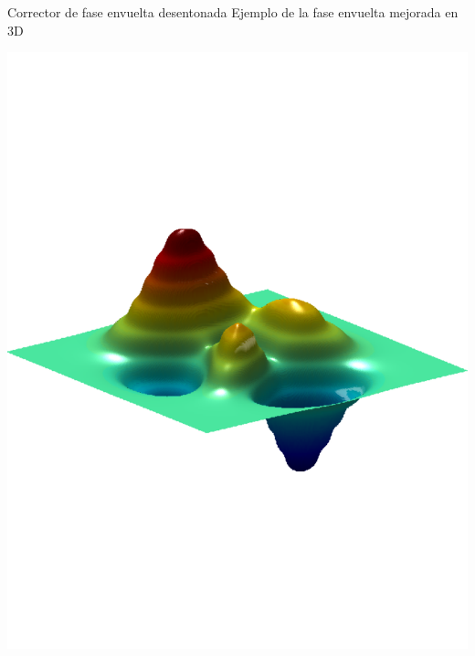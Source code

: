 \documentclass[]{beamer}
\begin{document}
\begin{frame}{Corrector de fase envuelta desentonada}
Ejemplo de la fase envuelta mejorada en 3D
\begin{center}

\includegraphics[scale=0.27]{Images/FaseError_Ideal_3D.pdf}

\end{center}
\end{frame}
\end{document}
